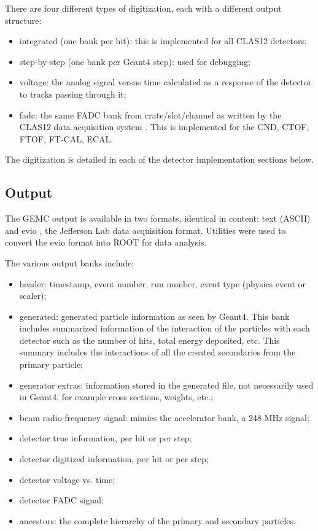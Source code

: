 There are four different types of digitization, each with a different output structure:

\begin{itemize}
	\item integrated (one bank per hit): this is implemented for all CLAS12 detectors;
	\item step-by-step (one bank per Geant4 step): used for debugging;
	\item voltage: the analog signal versus time calculated as a response of the detector to tracks passing through it;
	\item fadc: the same FADC bank from crate/slot/channel as written by the CLAS12 data acquisition system \cite{daq-nim}.
          This is implemented for the CND, CTOF, FTOF, FT-CAL, ECAL.
\end{itemize}


The digitization is detailed in each of the detector implementation sections below.


\subsection{Output}

The GEMC output is available in two formats, identical in content: text (ASCII) and evio \cite{evio}, the Jefferson Lab
data acquisition format.
Utilities were used to convert the evio format into ROOT \cite{root} for data analysis.

The various output banks include:

\begin{itemize}
	\item header: timestamp, event number, run number, event type (physics event or scaler);
	\item generated: generated particle information as seen by Geant4. This bank includes summarized information of the interaction of
                     the particles with each detector such as the number of hits, total energy deposited, etc. This summary includes
                     the interactions of all the created secondaries from the primary particle;
	\item generator extras: information stored in the generated file, not necessarily used in Geant4, for example cross sections, weights, etc.;
	\item beam radio-frequency signal: mimics the accelerator bank, a 248 MHz signal;
	\item detector true information, per hit or per step;
	\item detector digitized information, per hit or per step;
	\item detector voltage vs. time;
	\item detector FADC signal;
	\item ancestors: the complete hierarchy of the primary and secondary particles.
\end{itemize}

